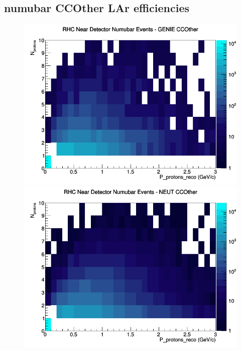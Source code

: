 \documentclass[12pt]{article}
\begin{document}
\subsection{numubar CCOther LAr efficiencies}
\begin{figure}[h]
\includegraphics[width=\linewidth]{eff_N_P/LAr/protons/CCOther_RHC_ND_numubar_N_P_GENIE.png}
\endminipage
{}
\includegraphics[width=\linewidth]{eff_N_P/LAr/protons/CCOther_RHC_ND_numubar_N_P_NEUT.png}
\endminipage
{}

\end{figure}
\end{document}
